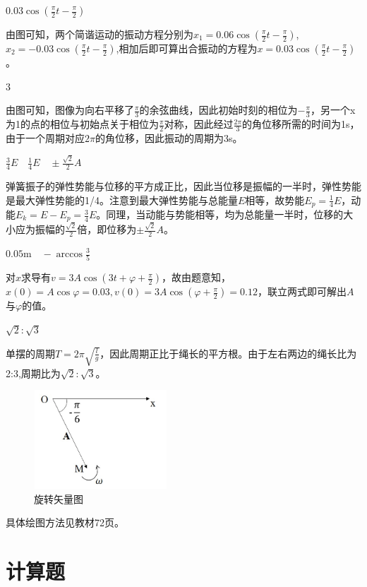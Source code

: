 \exercise $0.03\cos(\frac{\pi}{2}t-\frac{\pi}{2})$

\solve
由图可知，两个简谐运动的振动方程分别为$x_1=0.06\cos(\frac{\pi}{2}t-\frac{\pi}{2})$,$x_2=-0.03\cos(\frac{\pi}{2}t-\frac{\pi}{2})$,相加后即可算出合振动的方程为$x=0.03\cos(\frac{\pi}{2}t-\frac{\pi}{2})$。

\exercise $3$

\solve
由图可知，图像为向右平移了$\frac{\pi}{3}$的余弦曲线，因此初始时刻的相位为$-\frac{\pi}{3}$，另一个x为1的点的相位与初始点关于相位为$\frac{\pi}{2}$对称，因此经过$\frac{2\pi}{3}$的角位移所需的时间为1s，由于一个周期对应$2\pi$的角位移，因此振动的周期为3s。

\exercise $\frac{3}{4}E \quad \frac{1}{4}E \quad \pm\frac{\sqrt{2}}{2}A$

\solve
弹簧振子的弹性势能与位移的平方成正比，因此当位移是振幅的一半时，弹性势能是最大弹性势能的1/4。注意到最大弹性势能与总能量$E$相等，故势能$E_p=\frac{1}{4}E$，动能$E_k=E-E_p=\frac{3}{4}E$。同理，当动能与势能相等，均为总能量一半时，位移的大小应为振幅的$\frac{\sqrt{2}}{2}$倍，即位移为$\pm\frac{\sqrt{2}}{2}A$。

\exercise $0.05\mathrm{m}\quad -\arccos{\frac{3}{5}}$

\solve
对$x$求导有$v=3A\cos(3t+\varphi+\frac{\pi}{2})$，故由题意知，$x(0)=A\cos\varphi=0.03,v(0)=3A\cos(\varphi+\frac{\pi}{2})=0.12$，联立两式即可解出$A$与$\varphi$的值。

\exercise $\sqrt{2}:\sqrt{3}$

\solve
单摆的周期$T=2\pi\sqrt{\frac{l}{g}}$，因此周期正比于绳长的平方根。由于左右两边的绳长比为2:3,周期比为$\sqrt{2}:\sqrt{3}$。

\exercise

\solve
\begin{figure}[htb]
\centering
\includegraphics[height=3.7cm,width=5cm]{./pics/Chp13_20.jpg}
\caption{旋转矢量图}
\end{figure}
具体绘图方法见教材72页。

\section{计算题}
\exercise

